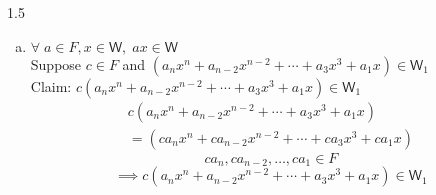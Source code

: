 \documentclass[letterpaper,12pt]{article}
\newcommand{\?}{\stackrel{?}{=}}
\begin{document}
\begin{spacing}{1.5}
\begin{enumerate}
\begin{enumerate}[(a)]
\paragraph{} 
Without loss of generality assume $n\leq m \implies \exists\; k \in
\left[0,\frac{n-1}{2}\right]$ such that $m= n -2k$
\begin{multline}
\left(a_nx^n + a_{n-2}x^{n-2}+\cdots+ a_3x^3 + a_1x\right) + \\
\left(b_mx^m + b_{m-2}x^{m-2}+\cdots+ b_3x^3 +
  b_1x\right)
\end{multline}
\begin{multline}
\left(a_nx^n + a_{n-2}x^{n-2}+\cdots+\\
  \left(a_{n-2k}+b_{n-2k}\right)\left(x^{n-2k}\right)+ 
  \left(a_{n-2k-2}+b_{n-2k-2}\right)\left(x^{n-2k-2}\right) +\cdots+ \\
\left(a_3+b_3\right)x^3 + \left(a_1+b_1\right)x\right)
\end{multline}
\begin{multline}
\implies \left(a_nx^n + a_{n-2}x^{n-2}+\cdots+ a_3x^3 + a_1x\right) +\\
\left(b_mx^m + b_{m-2}x^{m-2}+\cdots+ b_3x^3 +b_1x\right) \in \mathsf{W}_1
\end{multline}
\item $ \forall\; a\in F, x \in \mathsf{W}, \; ax \in \mathsf{W}$
\\
Suppose $c\in F$ and $\left(a_nx^n + a_{n-2}x^{n-2}+\cdots+ a_3x^3 +
  a_1x\right)\in \mathsf{W}_1$\\
Claim: $ c\left(a_nx^n + a_{n-2}x^{n-2}+\cdots+ a_3x^3 + a_1x\right)
\in \mathsf{W}_1$
\begin{multline}
c\left(a_nx^n + a_{n-2}x^{n-2}+\cdots+ a_3x^3 + a_1x\right)\\
= \left(ca_nx^n + ca_{n-2}x^{n-2}+\cdots+ ca_3x^3 + ca_1x\right)
\end{multline}
\begin{equation}
ca_n,ca_{n-2},\dots,ca_1 \in F
\end{equation}
\begin{equation}
\implies c\left(a_nx^n + a_{n-2}x^{n-2}+\cdots+ a_3x^3 + a_1x\right) \in \mathsf{W}_1
\end{equation}
\end{enumerate}


\end{enumerate}
\end{spacing}
\end{document}
